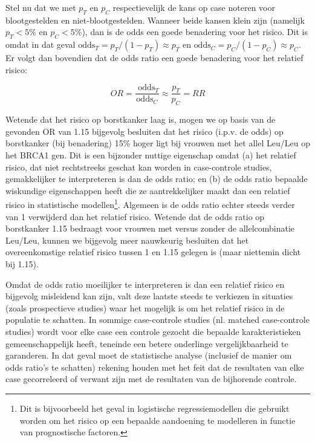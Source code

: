 \documentclass[
  12pt,dutch,coursenotes]{book}
\theoremstyle{definition}
\theoremstyle{definition}
\theoremstyle{definition}
\theoremstyle{remark}
\begin{document}
Stel nu dat we met \(p_T\) en \(p_C\) respectievelijk de kans op case noteren
voor blootgestelden en niet-blootgestelden. Wanneer beide kansen klein zijn
(namelijk \(p_T<5\%\) en \(p_C<5\%\)), dan is de odds een goede benadering voor
het risico. Dit is omdat in dat geval \(\mbox{odds}_T=p_T/(1-p_T)\approx p_T\) en \(\mbox{odds}_C=p_C/(1-p_C)\approx p_C\). Er volgt dan bovendien dat de odds ratio
een goede benadering voor het relatief risico:

\begin{equation*}
OR=\frac{\mbox{ odds}_T}{\mbox{
odds}_C}\approx \frac{p_T}{p_C}=RR
\end{equation*}

Wetende dat het risico op borstkanker laag is, mogen we
op basis van de gevonden OR van 1.15 bijgevolg
besluiten dat het risico (i.p.v. de odds) op borstkanker (bij benadering) 15\% hoger ligt bij vrouwen met het allel Leu/Leu op het BRCA1 gen. Dit is een bijzonder
nuttige eigenschap omdat (a) het relatief risico, dat niet rechtstreeks
geschat kan worden in case-controle studies, gemakkelijker te interpreteren
is dan de odds ratio; en (b) de odds ratio bepaalde wiskundige eigenschappen
heeft die ze aantrekkelijker maakt dan een relatief risico in statistische
modellen\footnote{Dit is bijvoorbeeld het geval in logistische regressiemodellen die gebruikt worden om het
  risico op een bepaalde aandoening te modelleren in functie van prognostische
  factoren.}. Algemeen is de odds ratio echter steeds verder van 1 verwijderd
dan het relatief risico. Wetende dat de odds ratio op borstkanker 1.15
bedraagt voor vrouwen met versus zonder de allelcombinatie Leu/Leu, kunnen we bijgevolg meer
nauwkeurig besluiten dat het overeenkomstige relatief risico tussen 1 en 1.15
gelegen is (maar niettemin dicht bij 1.15).

Omdat de odds ratio moeilijker te interpreteren is dan een relatief risico
en bijgevolg misleidend kan zijn, valt deze laatste steeds te verkiezen in
situaties (zoals prospectieve studies) waar het mogelijk is om het relatief
risico in de populatie te schatten. In sommige case-controle studies (nl.
matched case-controle studies) wordt voor elke case een controle gezocht die
bepaalde karakteristieken gemeenschappelijk heeft, teneinde een betere
onderlinge vergelijkbaarheid te garanderen. In dat geval moet de
statistische analyse (inclusief de manier om odds ratio's te schatten)
rekening houden met het feit dat de resultaten van elke case gecorreleerd of
verwant zijn met de resultaten van de bijhorende controle.
\end{document}
